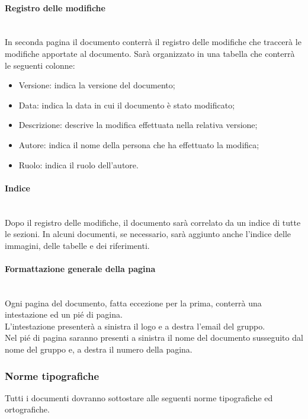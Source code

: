 	\paragraph{Registro delle modifiche}
	~\\In seconda pagina il documento conterrà il registro delle modifiche che traccerà le modifiche apportate al documento. Sarà organizzato in una tabella che conterrà le seguenti colonne:
	\begin{itemize}
		\item Versione:
		indica la versione del documento;
		\item Data:
		indica la data in cui il documento è stato modificato;
		\item Descrizione:
		descrive la modifica effettuata nella relativa versione;
		\item Autore:
		indica il nome della persona che ha effettuato la modifica;
		\item Ruolo:
		indica il ruolo dell'autore.
	\end{itemize}
	\paragraph{Indice}
	~\\Dopo il registro delle modifiche, il documento sarà correlato da un indice di tutte le sezioni. In alcuni documenti, se necessario, sarà aggiunto anche l'indice delle immagini, delle tabelle e dei riferimenti.
	\paragraph{Formattazione generale della pagina}
	~\\Ogni pagina del documento, fatta eccezione per la prima, conterrà una intestazione ed un pié di pagina.
	\\L'intestazione presenterà a sinistra il logo e a destra l'email del gruppo.
	\\Nel pié di pagina saranno presenti a sinistra il nome del documento susseguito dal nome del gruppo e, a destra il numero della pagina.
	\subsubsection{Norme tipografiche}
	Tutti i documenti dovranno sottostare alle seguenti norme tipografiche ed ortografiche.
